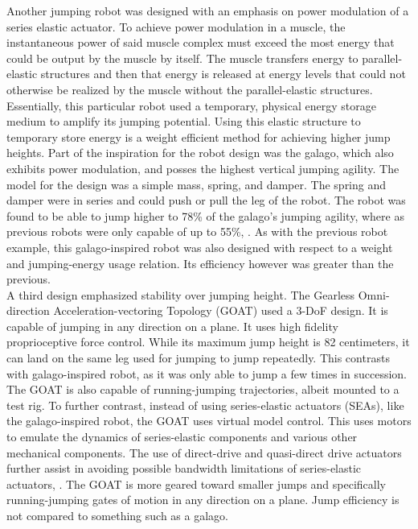 \indent Another jumping robot was designed with an emphasis on power modulation of a series elastic actuator. To achieve power modulation in a muscle, the instantaneous power of said muscle complex must exceed the most energy that could be output by the muscle by itself. The muscle transfers energy to parallel-elastic structures and then that energy is released at energy levels that could not otherwise be realized by the muscle without the parallel-elastic structures. Essentially, this particular robot used a temporary, physical energy storage medium to amplify its jumping potential. Using this elastic structure to temporary store energy is a weight efficient method for achieving higher jump heights. Part of the inspiration for the robot design was the galago, which also exhibits power modulation, and posses the highest vertical jumping agility. The model for the design was a simple mass, spring, and damper. The spring and damper were in series and could push or pull the leg of the robot. The robot was found to be able to jump higher to 78\% of the galago's jumping agility, where as previous robots were only capable of up to 55\%, \cite{haldane_robotic_2016}. As with the previous robot example, this galago-inspired robot was also designed with respect to a weight and jumping-energy usage relation. Its efficiency however was greater than the previous.\\

\indent A third design emphasized stability over jumping height. The Gearless Omni-direction Acceleration-vectoring Topology (GOAT) used a 3-DoF design. It is capable of jumping in any direction on a plane. It uses high fidelity proprioceptive force control. While its maximum jump height is 82 centimeters, it can land on the same leg used for jumping to jump repeatedly. This contrasts with galago-inspired robot, as it was only able to jump a few times in succession. The GOAT is also capable of running-jumping trajectories, albeit mounted to a test rig. To further contrast, instead of using series-elastic actuators (SEAs), like the galago-inspired robot, the GOAT uses virtual model control. This uses motors to emulate the dynamics of series-elastic components and various other mechanical components. The use of direct-drive and quasi-direct drive actuators further assist in avoiding possible bandwidth limitations of series-elastic actuators, \cite{kalouche_goat:_2017}. The GOAT is more geared toward smaller jumps and specifically running-jumping gates of motion in any direction on a plane. Jump efficiency is not compared to something such as a galago.\\

